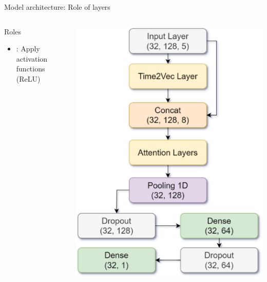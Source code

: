 \documentclass[compress, mathserif, fleqn, 10pt]{beamer}
\begin{document}
\begin{frame}{Model architecture: Role of layers}
\begin{columns}
\begin{column}{0.55\textwidth}
\begin{block}{Roles}
\begin{itemize}
						\item {}: Apply activation functions (ReLU)
					\end{itemize}
				\end{block}
			\end{column}
			\begin{column}{0.45\textwidth}
				\centerline{\includegraphics[width=\textwidth]{images/model-mini.eps}}
			\end{column}
		\end{columns}
	\end{frame}
	
\end{document}
